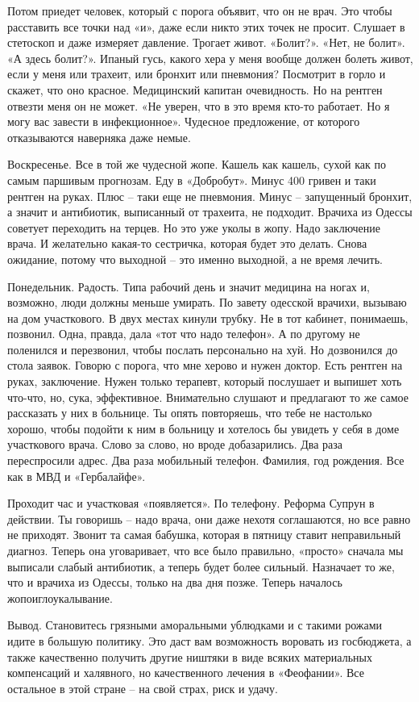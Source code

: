 Потом приедет человек, который с порога объявит, что он не врач. Это чтобы
расставить все точки над «и», даже если никто этих точек не просит. Слушает в
стетоскоп и даже измеряет давление. Трогает живот. «Болит?». «Нет, не болит».
«А здесь болит?». Ипаный гусь, какого хера у меня вообще должен болеть живот,
если у меня или трахеит, или бронхит или пневмония? Посмотрит в горло и скажет,
что оно красное. Медицинский капитан очевидность. Но на рентген отвезти меня он
не может. «Не уверен, что в это время кто-то работает. Но я могу вас завести в
инфекционное». Чудесное предложение, от которого отказываются наверняка даже
немые.

Воскресенье. Все в той же чудесной жопе. Кашель как кашель, сухой как по самым
паршивым прогнозам. Еду в «Добробут». Минус 400 гривен и таки рентген на руках.
Плюс – таки еще не пневмония. Минус – запущенный бронхит, а значит и
антибиотик, выписанный от трахеита, не подходит. Врачиха из Одессы советует
переходить на терцев. Но это уже уколы в жопу. Надо заключение врача. И
желательно какая-то сестричка, которая будет это делать. Снова ожидание, потому
что выходной – это именно выходной, а не время лечить. 

Понедельник. Радость. Типа рабочий день и значит медицина на ногах и, возможно,
люди должны меньше умирать. По завету одесской врачихи, вызываю на дом
участкового. В двух местах кинули трубку. Не в тот кабинет, понимаешь,
позвонил. Одна, правда, дала «тот что надо телефон». А по другому не поленился
и перезвонил, чтобы послать персонально на хуй. Но дозвонился до стола заявок.
Говорю с порога, что мне херово и нужен доктор. Есть рентген на руках,
заключение. Нужен только терапевт, который послушает и выпишет хоть что-что,
но, сука, эффективное. Внимательно слушают и предлагают то же самое рассказать
у них в больнице. Ты опять повторяешь, что тебе не настолько хорошо, чтобы
подойти к ним в больницу и хотелось бы увидеть у себя в доме участкового врача.
Слово за слово, но вроде добазарились. Два раза переспросили адрес. Два раза
мобильный телефон. Фамилия, год рождения. Все как в МВД и «Гербалайфе». 

Проходит час и участковая «появляется». По телефону. Реформа Супрун в действии.
Ты говоришь – надо врача, они даже нехотя соглашаются, но все равно не
приходят. Звонит та самая бабушка, которая в пятницу ставит неправильный
диагноз. Теперь она уговаривает, что все было правильно, «просто» сначала мы
выписали слабый антибиотик, а теперь будет более сильный. Назначает то же, что
и врачиха из Одессы, только на два дня позже. Теперь началось
жопоиглоукалывание.

Вывод. Становитесь грязными аморальными ублюдками и с такими рожами идите в
большую политику. Это даст вам возможность воровать из госбюджета, а также
качественно получить другие ништяки в виде всяких материальных компенсаций и
халявного, но качественного лечения в «Феофании». Все остальное в этой стране –
на свой страх, риск и удачу.

